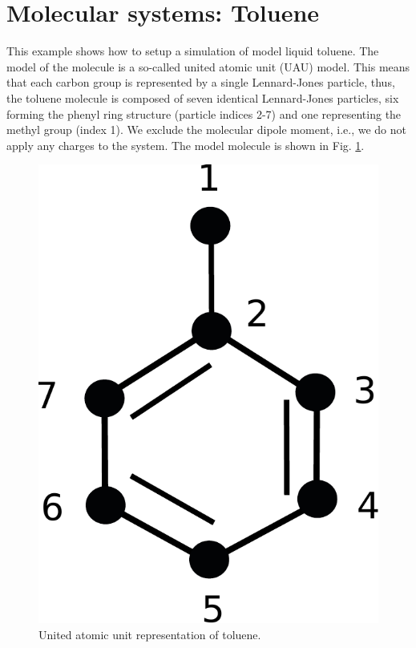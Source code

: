 \documentclass[11pt]{article}
\begin{document}
\section{Molecular systems: Toluene}
This example shows how to setup a simulation of model liquid toluene. The model
of the molecule is a so-called united atomic unit (UAU) model. This means that
each carbon group is represented by a single Lennard-Jones particle, thus, the
toluene molecule is composed of seven identical Lennard-Jones particles, six
forming the phenyl ring structure (particle indices 2-7) and one representing
the methyl group (index 1).  We exclude the molecular dipole moment, i.e., we do
not apply any charges to the system. The model molecule is shown in
Fig. \ref{fig:toluene}.
\begin{figure}[h]
  \begin{center}
    \includegraphics[scale=.4]{toluene.pdf}
  \caption{
    \label{fig:toluene}
    United atomic unit representation of toluene.
  }
  \end{center}
\end{figure}
\end{document}
